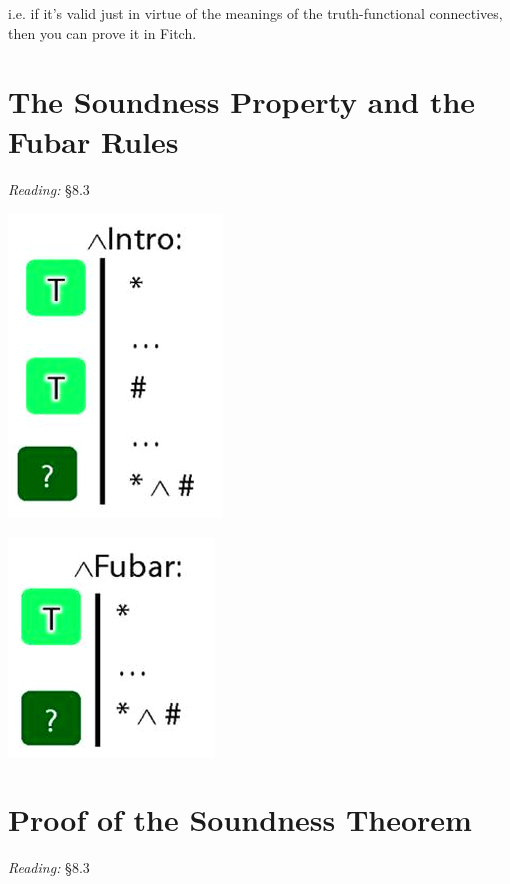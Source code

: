 \documentclass[12pt]{extarticle}
\begin{document}
\begin{multicols*}{3}
\hspace{3mm} i.e. if it’s valid just in virtue of the meanings of the truth-functional connectives, then you can prove it in Fitch.
 
 
 
\section{The Soundness Property and the Fubar Rules}
 
\emph{Reading:} §8.3
 
\begin{center}
\includegraphics[scale=0.3]{img/unit_346_and.png}
\end{center}
\begin{center}
\includegraphics[scale=0.3]{img/unit_346_fubar.png}
\end{center}
 
 
\section{Proof of the Soundness Theorem}
 
\emph{Reading:} §8.3
 
\begin{minipage}{\columnwidth}
 

\end{minipage}
\end{multicols*}
\end{document}
